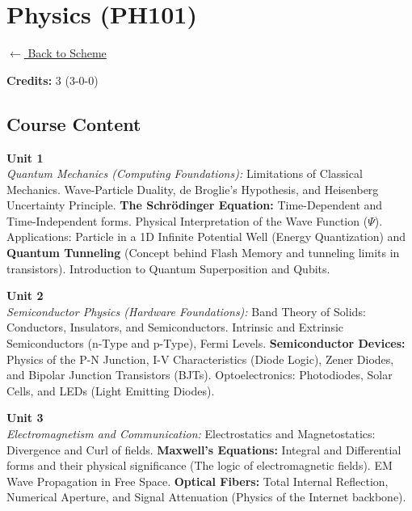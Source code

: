 \section*{Physics (PH101)}
\label{course:PH101}

\noindent \small{\hyperref[main:scheme]{$\leftarrow$ Back to Scheme}} \vspace{0.5cm}

\noindent \textbf{Credits:} 3 (3-0-0)

\subsection*{Course Content}
\noindent\textbf{Unit 1} \\
\textit{Quantum Mechanics (Computing Foundations):} Limitations of Classical Mechanics. Wave-Particle Duality, de Broglie’s Hypothesis, and Heisenberg Uncertainty Principle. \textbf{The Schrödinger Equation:} Time-Dependent and Time-Independent forms. Physical Interpretation of the Wave Function ($\Psi$). Applications: Particle in a 1D Infinite Potential Well (Energy Quantization) and \textbf{Quantum Tunneling} (Concept behind Flash Memory and tunneling limits in transistors). Introduction to Quantum Superposition and Qubits.

\vspace{0.3cm}

\noindent\textbf{Unit 2} \\
\textit{Semiconductor Physics (Hardware Foundations):} Band Theory of Solids: Conductors, Insulators, and Semiconductors. Intrinsic and Extrinsic Semiconductors (n-Type and p-Type), Fermi Levels. \textbf{Semiconductor Devices:} Physics of the P-N Junction, I-V Characteristics (Diode Logic), Zener Diodes, and Bipolar Junction Transistors (BJTs). Optoelectronics: Photodiodes, Solar Cells, and LEDs (Light Emitting Diodes).

\vspace{0.3cm}

\noindent\textbf{Unit 3} \\
\textit{Electromagnetism and Communication:} Electrostatics and Magnetostatics: Divergence and Curl of fields. \textbf{Maxwell’s Equations:} Integral and Differential forms and their physical significance (The logic of electromagnetic fields). EM Wave Propagation in Free Space. \textbf{Optical Fibers:} Total Internal Reflection, Numerical Aperture, and Signal Attenuation (Physics of the Internet backbone).

